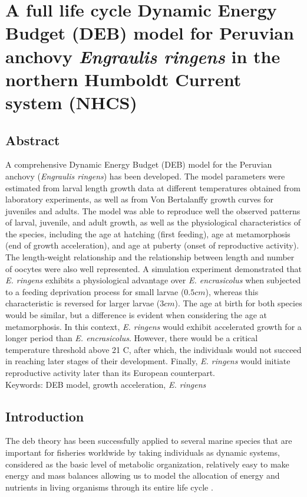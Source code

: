 \chapter{A full life cycle Dynamic Energy Budget (DEB) model for Peruvian anchovy \textit{Engraulis ringens} in the northern Humboldt Current system (NHCS)}\label{Chap4}

\clearpage
\section*{Abstract}
A comprehensive Dynamic Energy Budget (DEB) model for the Peruvian anchovy (\textit{Engraulis ringens}) has been developed. The model parameters were estimated from larval length growth data at different temperatures obtained from laboratory experiments, as well as from Von Bertalanffy growth curves for juveniles and adults. The model was able to reproduce well the observed patterns of larval, juvenile, and adult growth, as well as the physiological characteristics of the species, including the age at hatching (first feeding), age at metamorphosis (end of growth acceleration), and age at puberty (onset of reproductive activity). The length-weight relationship and the relationship between length and number of oocytes were also well represented. A simulation experiment demonstrated that \textit{E. ringens} exhibits a physiological advantage over \textit{E. encrasicolus} when subjected to a feeding deprivation process for small larvae ($0.5 cm$), whereas this characteristic is reversed for larger larvae ($3 cm$). The age at birth for both species would be similar, but a difference is evident when considering the age at metamorphosis. In this context, \textit{E. ringens} would exhibit accelerated growth for a longer period than \textit{E. encrasicolus}. However, there would be a critical temperature threshold above 21 \textdegree C, after which, the individuals would not succeed in reaching later stages of their development. Finally, \textit{E. ringens} would initiate reproductive activity later than its European counterpart.\\

Keywords: DEB model, growth acceleration, \textit{E. ringens}

\clearpage
\section{Introduction}

The \acrfull{deb} theory has been successfully applied to several marine species that are important for fisheries worldwide by taking individuals as dynamic systems, considered as the basic level of metabolic organization, relatively easy to make energy and mass balances allowing us to model the allocation of energy and nutrients in living organisms through its entire life cycle \citep{Kooi2009}.\\

